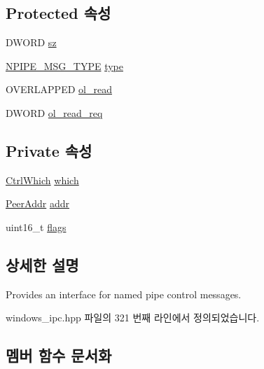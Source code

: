 \subsection*{Protected 속성}
\begin{DoxyCompactItemize}
\item 
D\+W\+O\+RD \hyperlink{class_windows_n_pipe_message_a09171c54248e2b5629cb28432fc246f7}{sz}
\item 
\hyperlink{windows__ipc_8hpp_a5a7d5ebd4af251aa73a4afcce1dc68a1}{N\+P\+I\+P\+E\+\_\+\+M\+S\+G\+\_\+\+T\+Y\+PE} \hyperlink{class_windows_n_pipe_message_af23d76d201079e292145d5f0acda4940}{type}
\item 
O\+V\+E\+R\+L\+A\+P\+P\+ED \hyperlink{class_windows_n_pipe_message_a710906aa9e22a9cb7a3f1527445f9825}{ol\+\_\+read}
\item 
D\+W\+O\+RD \hyperlink{class_windows_n_pipe_message_a00febefc15f04548b030593221502d72}{ol\+\_\+read\+\_\+req}
\end{DoxyCompactItemize}
\subsection*{Private 속성}
\begin{DoxyCompactItemize}
\item 
\hyperlink{windows__ipc_8hpp_a584396bb9236c4d39596e9f285a43313}{Ctrl\+Which} \hyperlink{class_win_n_pipe_ctrl_message_a05a30a0c0a7ecee05dd02c8d03e6f1d5}{which}
\item 
\hyperlink{class_peer_addr}{Peer\+Addr} \hyperlink{class_win_n_pipe_ctrl_message_a2fac2b1fbbf46cf80895a34807da1e5f}{addr}
\item 
uint16\+\_\+t \hyperlink{class_win_n_pipe_ctrl_message_a1e87af3c18a2fd36c61faf89949bdc3f}{flags}
\end{DoxyCompactItemize}


\subsection{상세한 설명}
Provides an interface for named pipe control messages. 

windows\+\_\+ipc.\+hpp 파일의 321 번째 라인에서 정의되었습니다.



\subsection{멤버 함수 문서화}
